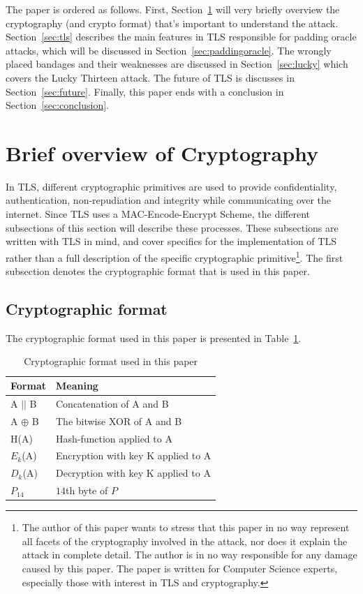 \documentclass[10pt,conference,a4paper]{IEEEtran}
\begin{document}
The paper is ordered as follows. First, Section~\ref{sec:crypto} will very briefly overview the cryptography (and crypto format) that's important to understand the attack. Section~\ref{sec:tls} describes the main features in TLS responsible for padding oracle attacks, which will be discussed in Section~\ref{sec:paddingoracle}. The wrongly placed bandages and their weaknesses are discussed in Section~\ref{sec:lucky} which covers the Lucky Thirteen attack. The future of TLS is discusses in Section~\ref{sec:future}. Finally, this paper ends with a conclusion in Section~\ref{sec:conclusion}.



\section{Brief overview of Cryptography}
\label{sec:crypto}
In TLS, different cryptographic primitives are used to provide confidentiality, authentication, non-repudiation and integrity while communicating over the internet. Since TLS uses a MAC-Encode-Encrypt Scheme, the different subsections of this section will describe these processes. These subsections are written with TLS in mind, and cover specifics for the implementation of TLS rather than a full description of the specific cryptographic primitive\footnote{The author of this paper wants to stress that this paper in no way represent all facets of the cryptography involved in the attack, nor does it explain the attack in complete detail. The author is in no way responsible for any damage caused by this paper. The paper is written for Computer Science experts, especially those with interest in TLS and cryptography.}. The first subsection denotes the cryptographic format that is used in this paper.

\subsection{Cryptographic format}
\label{sec:crypto:format}
The cryptographic format used in this paper is presented in Table~\ref{sec:crypto:format:table}.
\begin{table}[h]
    \begin{tabular}{l|l}
    Format & Meaning \\ \hline
    A $||$ B    & Concatenation of A and B  \\
    A $\oplus$ B  & The bitwise XOR of A and B     \\
    H(A)    & Hash-function applied to A    \\
    $E_k$(A)    & Encryption with key K applied to A    \\
    $D_k$(A)    & Decryption with key K applied to A    \\
    $P_{14}$    & $14$th byte of $P$ \\
    \end{tabular}
    \caption{Cryptographic format used in this paper}
    \label{sec:crypto:format:table}
\end{table}
\end{document}
